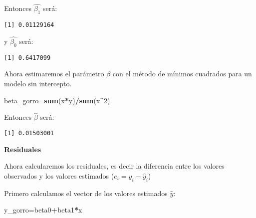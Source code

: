 \documentclass[
  a4paper,
  oneside,
  openany]{book}
\newenvironment{Shaded}{\begin{snugshade}}{\end{snugshade}}
\newcommand{\DecValTok}[1]{\textcolor[rgb]{0.00,0.00,0.81}{#1}}
\newcommand{\KeywordTok}[1]{\textcolor[rgb]{0.13,0.29,0.53}{\textbf{#1}}}
\newcommand{\NormalTok}[1]{#1}
\newcommand{\OperatorTok}[1]{\textcolor[rgb]{0.81,0.36,0.00}{\textbf{#1}}}
\begin{document}
\begin{Shaded}
\end{Shaded}

Entonces \(\hat{\beta_{1}}\) será:

\begin{verbatim}
[1] 0.01129164
\end{verbatim}

y \(\hat{\beta_{0}}\) será:

\begin{verbatim}
[1] 0.6417099
\end{verbatim}

Ahora estimaremos el parámetro \(\beta\) con el método de mínimos cuadrados para un modelo sin intercepto.

\begin{Shaded}
\begin{Highlighting}[]
\NormalTok{beta\_gorro=}\KeywordTok{sum}\NormalTok{(x}\OperatorTok{*}\NormalTok{y)}\OperatorTok{/}\KeywordTok{sum}\NormalTok{(x}\OperatorTok{\^{}}\DecValTok{2}\NormalTok{)}
\end{Highlighting}
\end{Shaded}

Entonces \(\hat{\beta}\) será:

\begin{verbatim}
[1] 0.01503001
\end{verbatim}

\textbf{Residuales}

Ahora calcularemos los residuales, es decir la diferencia entre los valores observados y los valores estimados (\(e_i = y_i-\hat{y}_i\))

Primero calculamos el vector de los valores estimados \(\hat{y}\):

\begin{Shaded}
\begin{Highlighting}[]
\NormalTok{y\_gorro=beta0}\OperatorTok{+}\NormalTok{beta1}\OperatorTok{*}\NormalTok{x}
\end{Highlighting}
\end{Shaded}
\end{document}

